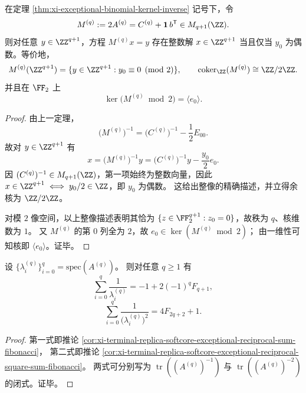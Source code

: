 \begin{proposition}[整格像的首坐标二元判别与余核刚性]\label{prop:xi-exceptional-binomial-kernel-image-cokernel}
在定理 \ref{thm:xi-exceptional-binomial-kernel-inverse} 记号下，令
\[
M^{(q)}:=2A^{(q)}=C^{(q)}+\mathbf 1\,b^{\mathsf T}\in M_{q+1}(\ZZ).
\]
则对任意 \(y\in\ZZ^{q+1}\)，方程 \(M^{(q)}x=y\) 存在整数解 \(x\in\ZZ^{q+1}\) 当且仅当 \(y_0\) 为偶数。等价地，
\[
M^{(q)}(\ZZ^{q+1})
=\{y\in\ZZ^{q+1}:y_0\equiv 0\pmod 2\},
\qquad
\mathrm{coker}_{\ZZ}(M^{(q)})\cong \ZZ/2\ZZ.
\]
并且在 \(\FF_2\) 上
\[
\ker\!\bigl(M^{(q)}\bmod 2\bigr)=\langle e_0\rangle.
\]
\end{proposition}
\begin{proof}
由上一定理，
\[
\bigl(M^{(q)}\bigr)^{-1}
=\bigl(C^{(q)}\bigr)^{-1}-\frac12E_{00}.
\]
故对 \(y\in\ZZ^{q+1}\) 有
\[
x=\bigl(M^{(q)}\bigr)^{-1}y
=\bigl(C^{(q)}\bigr)^{-1}y-\frac{y_0}{2}e_0.
\]
因 \((C^{(q)})^{-1}\in M_{q+1}(\ZZ)\)，第一项始终为整数向量，因此
\(
x\in\ZZ^{q+1}\iff y_0/2\in\ZZ
\)，即 \(y_0\) 为偶数。
这给出整像的精确描述，并立得余核为 \(\ZZ/2\ZZ\)。

对模 \(2\) 像空间，以上整像描述表明其恰为 \(\{z\in\FF_2^{q+1}:z_0=0\}\)，故秩为 \(q\)、核维数为 \(1\)。
又 \(M^{(q)}\) 的第 \(0\) 列全为 \(2\)，故 \(e_0\in\ker(M^{(q)}\bmod 2)\)；
由一维性可知核即 \(\langle e_0\rangle\)。证毕。
\end{proof}

\begin{theorem}\label{thm:xi-exceptional-reciprocal-moment-fibonacci-unified}
设 \(\{\lambda_i^{(q)}\}_{i=0}^{q}=\mathrm{spec}(A^{(q)})\)。
则对任意 \(q\ge 1\) 有
\[
\sum_{i=0}^{q}\frac{1}{\lambda_i^{(q)}}
=-1+2(-1)^qF_{q+1},
\]
\[
\sum_{i=0}^{q}\frac{1}{\bigl(\lambda_i^{(q)}\bigr)^2}
=4F_{2q+2}+1.
\]
\end{theorem}
\begin{proof}
第一式即推论 \ref{cor:xi-terminal-replica-softcore-exceptional-reciprocal-sum-fibonacci}，
第二式即推论 \ref{cor:xi-terminal-replica-softcore-exceptional-reciprocal-square-sum-fibonacci}。
两式可分别写为
\(
\operatorname{tr}((A^{(q)})^{-1})
\)
与
\(
\operatorname{tr}((A^{(q)})^{-2})
\)
的闭式。证毕。
\end{proof}

